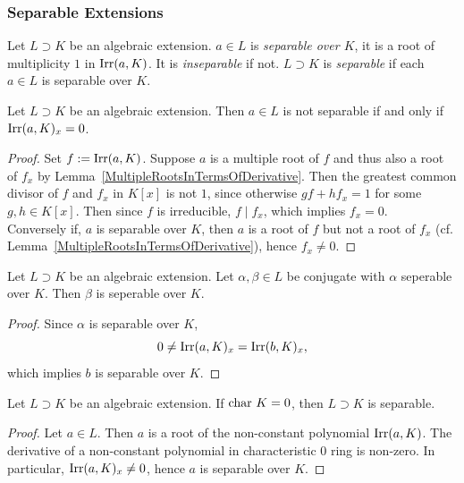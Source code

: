 \subsubsection{Separable Extensions}
\begin{definition}
    Let $L\supset K$ be an algebraic extension. $a\in L$ is \emph{separable over $K$}, it is a root of multiplicity $1$ in $\mathrm{Irr}(a,K)$. It is \emph{inseparable} if not. $L\supset K$ is \emph{separable} if each $a\in L$ is separable over $K$. 
\end{definition}
\begin{lemma}\label{SeparabilityInTermsOfDerivatives}
    Let $L\supset K$ be an algebraic extension. Then $a\in L$ is not separable if and only if $\mathrm{Irr}(a,K)_x=0$. 
\end{lemma}
\begin{proof}
    Set $f:= \mathrm{Irr}(a,K)$. Suppose $a$ is a multiple root of $f$ and thus also a root of $f_x$ by Lemma~\ref{MultipleRootsInTermsOfDerivative}. Then the greatest common divisor of $f$ and $f_x$ in $K[x]$ is not $1$, since otherwise $gf + hf_x = 1$ for some $g,h\in K[x]$. Then since $f$ is irreducible, $f\mid f_x$, which implies $f_x = 0$. \\
    Conversely if, $a$ is separable over $K$, then $a$ is a root of $f$ but not a root of $f_x$ (cf. Lemma~\ref{MultipleRootsInTermsOfDerivative}), hence $f_x\neq 0$.  
\end{proof}
\begin{corollary}
    Let $L\supset K$ be an algebraic extension. Let $\alpha,\beta\in L$ be conjugate with $\alpha$ seperable over $K$. Then $\beta$ is seperable over $K$.
\end{corollary}
\begin{proof}
    Since $\alpha$ is separable over $K$, 
    $$
        0\neq \mathrm{Irr}(a,K)_x = \mathrm{Irr}(b,K)_x,
    $$
    which implies $b$ is separable over $K$.
\end{proof}
\begin{lemma}\label{AlgebraicExtensionOfCharacteristicZeroFieldsAreSeparable}
    Let $L\supset K$ be an algebraic extension. If $\mathrm{char}\ K = 0$, then $L\supset K$ is separable. 
\end{lemma}
\begin{proof}
    Let $a\in L$. Then $a$ is a root of the non-constant polynomial $\mathrm{Irr}(a,K)$. The derivative of a non-constant polynomial in characteristic $0$ ring is non-zero. In particular, $\mathrm{Irr}(a,K)_x\neq 0$, hence $a$ is separable over $K$. 
\end{proof}

